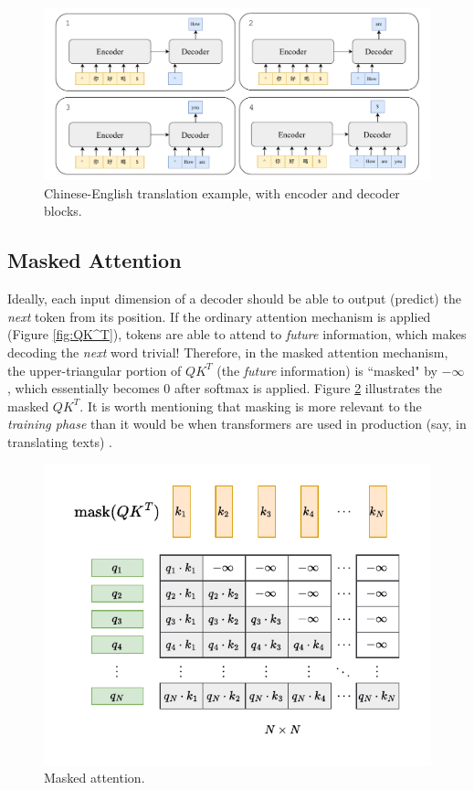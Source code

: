 \begin{figure}
    \centering
    \includegraphics[width=1\linewidth]{fig/example_translation.pdf}
    \caption{Chinese-English translation example, with encoder and decoder blocks.}
    \label{fig:example_translation}
\end{figure}

\subsection{Masked Attention}

Ideally, each input dimension of a decoder should be able to output (predict) the \textit{next} token from its position. If the ordinary attention mechanism is applied (Figure \ref{fig:QK^T}), tokens are able to attend to \textit{future} information, which makes decoding the \textit{next} word trivial! Therefore, in the masked attention mechanism, the upper-triangular portion of $QK^T$ (the \textit{future} information) is ``masked" by $-\infty$, which essentially becomes $0$ after softmax is applied. Figure \ref{fig:masked_attention} illustrates the masked $QK^T$. It is worth mentioning that masking is more relevant to the \textit{training phase} than it would be when transformers are used in production (say, in translating texts) \cite{3b1b}.

\begin{figure}
    \centering
    \includegraphics[width=0.8\linewidth]{fig/masked_attention.pdf}
    \caption{Masked attention.}
    \label{fig:masked_attention}
\end{figure}

